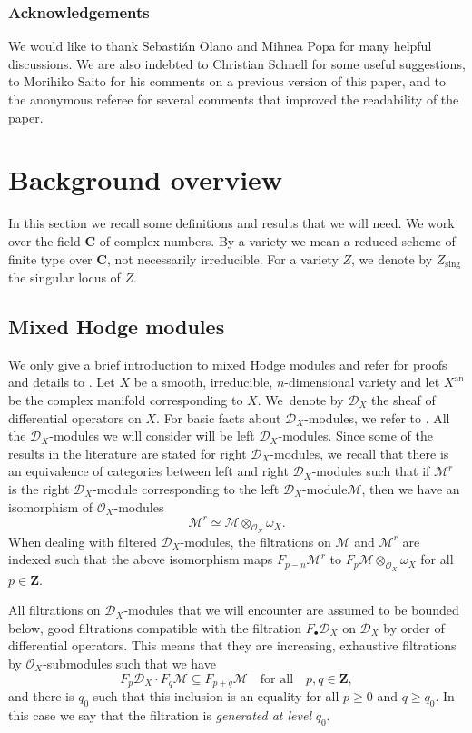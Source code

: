 \documentclass[JEP,XML,SOM,Unicode]{cedram}
\newcommand{\sbullet}{{\scriptscriptstyle\bullet}}
\newcommand{\DXmodule}{$\cD_X$\nobreakdash-mod\-ule\xspace}
\newcommand{\DXmodules}{$\cD_X$\nobreakdash-mod\-ules\xspace}
\theoremstyle{plain}
\theoremstyle{definition}
\newcommand\Z{{\mathbf Z}}
\newcommand\C{{\mathbf C}}
\newcommand\cD{\mathcal{D}}
\newcommand\cO{\mathcal{O}}
\newcommand\cM{\mathcal{M}}
\newcommand\cO{\mathcal{O}}
\newcommand\sing{\mathrm{sing}}
\begin{document}
\subsubsection*{Acknowledgements}
We would like to thank Sebastián Olano and Mihnea Popa for many helpful discussions.
We are also indebted to Christian Schnell for some useful suggestions, to Morihiko Saito for his comments on a previous version of this paper, and to the anonymous referee
for several comments that improved the readability of the paper.

\section{Background overview}\label{section2}

In this section we recall some definitions and results that we will need.
We work over the field $\C$ of complex numbers. By a variety we mean a reduced scheme of finite type over $\C$, not necessarily irreducible.
For a variety $Z$, we denote by $Z_\sing$ the singular locus of $Z$.

\subsection{Mixed Hodge modules}\label{section_MHM} We only give a brief introduction to mixed Hodge modules and refer for proofs and details to \cite{Saito_MHM}.
Let $X$ be a smooth, irreducible, $n$-dimensional variety and let $X^\mathrm{an}$ be the complex manifold corresponding to $X$. We~\hbox{denote} by $\cD_X$ the sheaf of differential operators on $X$. For basic facts about \DXmodules,
we refer to \cite{HTT}. All the \DXmodules we will consider will be left \DXmodules. Since some of the results in the literature are stated for
right \DXmodules, we recall that there is an equivalence of categories between left and right \DXmodules such that if $\cM^r$ is the right
\DXmodule corresponding to the left \DXmodule $\cM$, then we have an isomorphism of $\cO_X$-modules
\[\cM^r\simeq\cM\otimes_{\cO_X}\omega_X.\]
When dealing with filtered \DXmodules, the filtrations on $\cM$ and $\cM^r$ are indexed such that
the above isomorphism maps $F_{p-n}\cM^r$ to $F_p\cM\otimes_{\cO_X}\omega_X$ for all $p\in\Z$.

All filtrations on \DXmodules that we will encounter are assumed to be bounded below, good filtrations compatible with the
filtration $F_{\sbullet}\cD_X$ on $\cD_X$ by order of differential operators. This means that they are increasing, exhaustive filtrations by $\cO_X$-submodules such that we have
\[F_p\cD_X\cdot F_q\cM\subseteq F_{p+q}\cM\quad\text{for all}\quad p,q\in\Z,\]
and there is $q_0$ such that this inclusion is an equality for all $p\geq 0$ and $q\geq q_0$. In this case we say that the filtration is \emph{generated at level} $q_0$.
\end{document}
